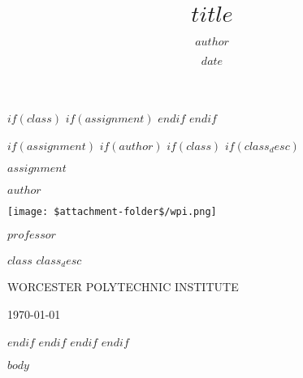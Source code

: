 \documentclass[12pt]{article}
\title{$title$}
\author{$author$}
\date{$date$}
\let\oldincludegraphics\includegraphics
\renewcommand{\includegraphics}[2][]{\oldincludegraphics[width=0.5\textwidth,#1]{#2}}
\begin{document}
$if(class)$
$if(assignment)$
\pagestyle{fancy}
\fancyhf{}
\renewcommand{\headrulewidth}{0pt}
\fancyfoot[C]{\thepage}
\fancyfoot[R]{\monthyeardate\today}
$endif$
$endif$

$if(assignment)$
$if(author)$
$if(class)$
$if(class_desc)$
\begin{titlepage}
    \centering
    \vspace*{2.5cm}
    
    {\Huge\bfseries $assignment$\par}
    \vspace{0.5cm}
    {\large $author$\par}
    \vspace{2.5cm}
    
    \texttt{[image: \$attachment-folder\$/wpi.png]}
    \vspace{2cm}
    
    {\large $professor$\par}
    \vspace{0.5cm}
    {\large $class$ $class_desc$\par}
    \vspace{0.5cm}
    {\large WORCESTER POLYTECHNIC INSTITUTE\par}
    \vspace{0.5cm}
    {\large\monthyeardate\today\par}
\end{titlepage}
$endif$
$endif$
$endif$
$endif$

$body$
\end{document}
